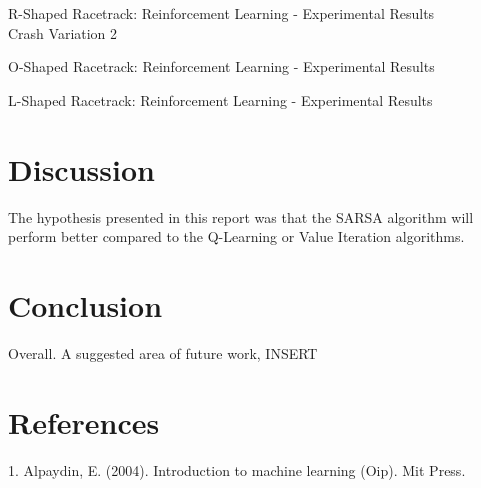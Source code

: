 \documentclass[twoside,11pt]{article}
\begin{document}
\begin{table}[h]
	\centering
	\caption{R-Shaped Racetrack: Reinforcement Learning - Experimental Results\\ Crash Variation 2}
	\label{tab:table2}
\end{table}

\begin{table}[h]
	\centering
	\caption{O-Shaped Racetrack: Reinforcement Learning - Experimental Results}
	\label{tab:table3}
\end{table}

\begin{table}[h]
	\centering
	\caption{L-Shaped Racetrack: Reinforcement Learning - Experimental Results}
	\label{tab:table4}
\end{table}

\newpage

\section{Discussion}
\hspace*{10mm} The hypothesis presented in this report was that the SARSA algorithm will perform better compared to the Q-Learning or Value Iteration algorithms.\\

\section{Conclusion}
\hspace*{10mm} Overall.\newline
\hspace*{10mm} A suggested area of future work, INSERT\newline

\section{References}
1. Alpaydin, E. (2004). Introduction to machine learning (Oip). Mit Press. 

\newpage
\end{document}
